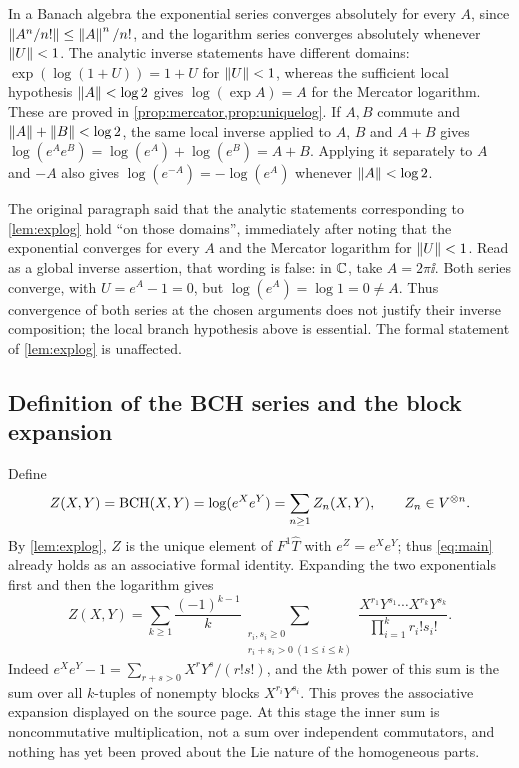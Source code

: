 In a Banach algebra the exponential series converges absolutely for every
$A$, since $\left\lVert A^n/n!\right\rVert\leq\left\lVert A\right\rVert^n/n!$, and the logarithm series converges
absolutely whenever $\left\lVert U\right\rVert<1$. The analytic inverse statements have
different domains: $\exp(\log(1+U))=1+U$ for $\left\lVert U\right\rVert<1$, whereas the
sufficient local hypothesis $\left\lVert A\right\rVert<\log2$ gives $\log(\exp A)=A$ for the
Mercator logarithm. These are proved in \cref{prop:mercator,prop:uniquelog}.
If $A,B$ commute and $\left\lVert A\right\rVert+\left\lVert B\right\rVert<\log2$, the same local inverse
applied to $A$, $B$ and $A+B$ gives
$\log(e^Ae^B)=\log(e^A)+\log(e^B)=A+B$. Applying it separately to $A$
and $-A$ also gives $\log(e^{-A})=-\log(e^A)$ whenever $\left\lVert A\right\rVert<\log2$.

\begin{remark}
\label{rem:analytic-inverse-domain}
The original paragraph said that the analytic statements corresponding to
\cref{lem:explog} hold ``on those domains'', immediately after noting that
the exponential converges for every $A$ and the Mercator logarithm for
$\left\lVert U\right\rVert<1$. Read as a global inverse assertion, that wording is false:
in $\mathbb{C}$, take $A=2\pi\ii$. Both series converge, with
$U=e^A-1=0$, but $\log(e^A)=\log1=0\ne A$. Thus convergence of both
series at the chosen arguments does not justify their inverse composition;
the local branch hypothesis above is essential. The formal statement of
\cref{lem:explog} is unaffected.
\end{remark}

\subsection{Definition of the BCH series and the block expansion}
Define
\begin{equation}\label{eq:Zdef}
 Z(X,Y)=\operatorname{BCH}(X,Y)=\log(e^Xe^Y)=\sum_{n\geq1}Z_n(X,Y),\qquad Z_n\in V^{\otimes n}.
\end{equation}
By \cref{lem:explog}, $Z$ is the unique element of $F^1\widehat T$ with
$e^Z=e^Xe^Y$; thus \eqref{eq:main} already holds as an associative formal
identity. Expanding the two exponentials first and then the logarithm gives
\begin{equation}\label{eq:blocks}
 Z(X,Y)=\sum_{k\geq1}\frac{(-1)^{k-1}}{k}
 \sum_{\substack{r_i,s_i\geq0\\r_i+s_i>0\ (1\leq i\leq k)}}
 \frac{X^{r_1}Y^{s_1}\cdots X^{r_k}Y^{s_k}}
 {\prod_{i=1}^k r_i!s_i!}.
\end{equation}
Indeed $e^Xe^Y-1=\sum_{r+s>0}X^rY^s/(r!s!)$, and the $k$th power of this sum
is the sum over all $k$-tuples of nonempty blocks $X^{r_i}Y^{s_i}$. This
proves the associative expansion displayed on the source page. At this stage
the inner sum is noncommutative multiplication, not a sum over independent
commutators, and nothing has yet been proved about the Lie nature of the
homogeneous parts.

